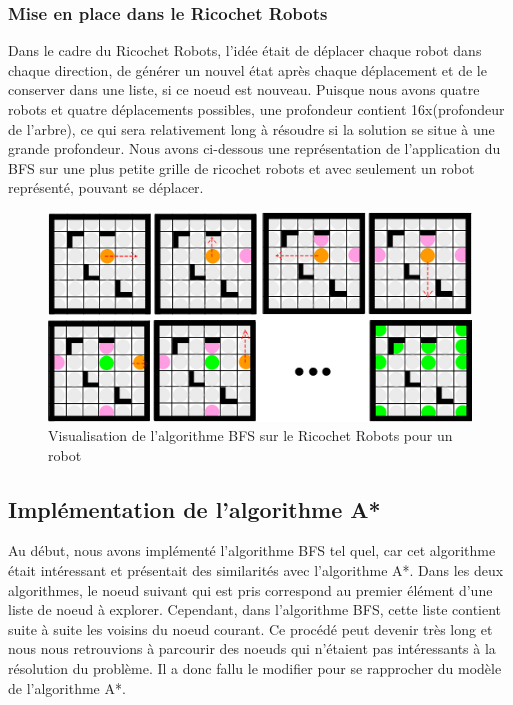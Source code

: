 \documentclass[a4paper, 12pt]{article}
\begin{document}
            \subsubsection{Mise en place dans le Ricochet Robots}
                Dans le cadre du  Ricochet Robots, l'idée était de déplacer chaque robot dans chaque direction, de générer un nouvel état après chaque déplacement et de le conserver dans une liste, si ce noeud est nouveau. Puisque nous avons quatre robots et quatre déplacements possibles, une profondeur contient 16x(profondeur de l'arbre), ce qui sera relativement long à résoudre si la solution se situe à une grande profondeur. Nous avons ci-dessous une représentation de l'application du BFS sur une plus petite grille de ricochet robots et avec seulement un robot représenté, pouvant se déplacer.
                
                \begin{figure}[H]
                    \centering
                    \includegraphics[scale=0.5]{images/bfsRicochet.png}
                    \caption{Visualisation de l'algorithme BFS sur le Ricochet Robots pour un robot}
                \end{figure}
            
        \subsection{Implémentation de l'algorithme A*}
        
            Au début, nous avons implémenté l'algorithme BFS tel quel, car cet algorithme était intéressant et présentait des similarités avec l'algorithme A*. Dans les deux algorithmes, le noeud suivant qui est pris correspond au premier élément d'une liste de noeud à explorer. Cependant, dans l'algorithme BFS, cette liste contient suite à suite les voisins du noeud courant. Ce procédé peut devenir très long et nous nous retrouvions à parcourir des noeuds qui n'étaient pas intéressants à la résolution du problème. Il a donc fallu le modifier pour se rapprocher du modèle de l'algorithme A*.
            
\end{document}
